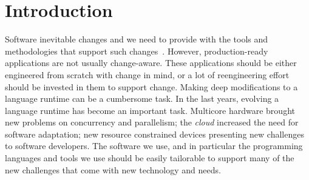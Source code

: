 
\chapter{Introduction}
\minitoc


%
%


Software inevitable changes and we need to provide with the tools and methodologies that support such changes~\cite{Nier08b}. However, production-ready applications are not usually change-aware. These applications should be either engineered from scratch with change in mind, or a lot of reengineering effort should be invested in them to support change. Making deep modifications to a language runtime can be a cumbersome task.
In the last years, evolving a language runtime has become an important task. Multicore hardware brought new problems on concurrency and parallelism; the \emph{cloud} increased the need for software adaptation; new resource constrained devices presenting new challenges to software developers. The software we use, and in particular the programming languages and tools we use should be easily tailorable to support many of the new challenges that come with new technology and needs.

